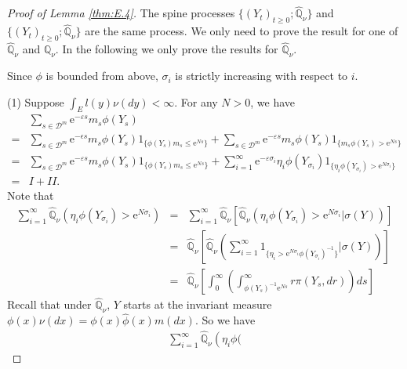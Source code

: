 \documentclass[12pt,a4paper]{amsart}
\numberwithin{equation}{section}
\theoremstyle{plain}
\theoremstyle{definition}
\theoremstyle{remark}
\begin{document}
\begin{proof}[Proof of Lemma \ref{thm:E.4}] The spine processes  $\{(Y_t)_{t\geq 0}; \widehat{\mathbb Q}_\nu\}$ and  $\{(Y_t)_{t\geq 0}; \widehat {\mathbb Q}_\nu\}$  are the same process. We only need to prove the result for one of $\widehat{\mathbb Q}_{\nu}$ and $\mathbb Q_{\nu}$. In the following we only prove the results for  $\widehat{\mathbb Q}_{\nu}$.



Since $\phi$ is bounded from above, $\sigma_i$ is strictly
increasing with respect to $i$.

(1) Suppose
$\int_E l(y)\nu(dy)<\infty$.
For any $N>0$, we have
\begin{equation}\label{sum}
\begin{array}{rl}
&\displaystyle\sum_{s\in \mathcal D^m}\mbox{e}^{-\varepsilon s}m_s\phi({Y}_s)\\
=&\displaystyle\sum_{s\in \mathcal D^m}
\mbox{e}^{-\epsilon s}m_s\phi(Y_s)
1_{\{\phi(Y_s)m_s\le\mbox{e}^{N
s}\}}+\sum_{s\in \mathcal
D^m}\mbox{e}^{-\varepsilon s}m_s\phi(Y_s)
1_{\{m_s\phi(Y_s)>\mbox{e}^{N
s}\}}\\
=&\displaystyle\sum_{s\in \mathcal
D^m}\mbox{e}^{-\varepsilon s}m_s\phi(Y_s) 1_{\{
\phi(Y_s)m_s\le \mbox{e}^{N s}
\}}+\sum_{i=1}^\infty\mbox{e}^{-\varepsilon\sigma_i}\eta_i
\phi(Y_{\sigma_i})
1_{\{\eta_i\phi(Y_{\sigma_i})>\mbox{e}^{N
\sigma_i}\}}\\=&I+II.\end{array}
\end{equation}
Note that
\begin{eqnarray*}
\sum_{i=1}^\infty \widehat{\mathbb Q}_{\nu}
\left(\eta_i\phi(Y_{\sigma_i}) > \mbox{e}^{N
\sigma_i}\right)&=&\sum_{i=1}^\infty
 \widehat{\mathbb Q}_{\nu}\left[\widehat{\mathbb Q}_{\nu}\left(\eta_i
\phi(Y_{\sigma_i})>\mbox{e}^{N
\sigma_i}\big|\sigma(Y)\right)\right]\\
&=&\widehat{\mathbb Q}_{\nu}\left[\widehat{\mathbb Q}_{\nu}\left(\sum_{i=1}^\infty
1_{\{\eta_i>\mbox{e}^{N \sigma_i}
\phi(Y_{\sigma_i})^{-1}\}}\Big|
\sigma(Y)\right)\right]\\
&=&\widehat{\mathbb Q}_{\nu}\left[\int_0^\infty
\left(\int^{\infty}_{\phi(Y_s)^{-1}\mbox{e}^{N s}}
r\pi(Y_s, dr)\right)ds\right]
\end{eqnarray*}
Recall that under $\widehat{\mathbb Q}_{\nu}$, $Y$ starts at the
invariant measure
$\phi(x)\nu(dx)=\phi(x)\widehat\phi(x)m(dx)$.
 So we have
\begin{eqnarray*}
\sum_{i=1}^\infty \widehat{\mathbb Q}_{\nu} \left(\eta_i\phi(

\end{eqnarray*}
\end{proof}
\end{document}
